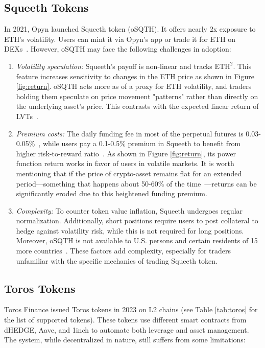 \subsection{Squeeth Tokens}\label{subsec:squeeth}
In 2021, Opyn launched Squeeth token (oSQTH). It offers nearly 2x exposure to ETH's volatility. Users can mint it via Opyn's app or trade it for ETH on DEXs~\cite{Squeeth_Doc}. However, oSQTH may face the following challenges in adoption:
\begin{enumerate}[label={\ref{subsec:squeeth}.\arabic*},leftmargin=*]
	\item \textit{Volatility speculation:} Squeeth's payoff is non-linear and tracks \( \text{ETH}^2 \). This feature increases sensitivity to changes in the ETH price as shown in Figure \ref{fig:return}. oSQTH acts more as of a proxy for ETH volatility, and traders holding them speculate on price movement "patterns" rather than directly on the underlying asset's price. This contrasts with the expected linear return of LVTs~\cite{Squeeth_Medium}.
	
	\item \textit{Premium costs:} The daily funding fee in most of the perpetual futures is 0.03-0.05\%~\cite{Coinglass_Funding}, while users pay a 0.1-0.5\% premium in Squeeth to benefit from higher risk-to-reward ratio~\cite{Squeeth_Funding}. As shown in Figure \ref{fig:return}, its power function return works in favor of users in volatile markets. It is worth mentioning that if the price of crypto-asset remains flat for an extended period—something that happens about 50-60\% of the time~\cite{bulkowski2011encyclopedia,edwards2007technical}—returns can be significantly eroded due to this heightened funding premium.
	
	\item \textit{Complexity:} To counter token value inflation, Squeeth undergoes regular normalization. Additionally, short positions require users to post collateral to hedge against volatility risk, while this is not required for long positions. Moreover, oSQTH is not available to U.S. persons and certain residents of 15 more countries~\cite{Squeeth_Restricted}. These factors add complexity, especially for traders unfamiliar with the specific mechanics of trading Squeeth token.
\end{enumerate}


\subsection{Toros Tokens}\label{subsec:toros}
Toros Finance issued Toros tokens in 2023 on L2 chains (see Table \ref{tab:toros} for the list of supported tokens). These tokens use different smart contracts from dHEDGE, Aave, and 1inch to automate both leverage and asset management. The system, while decentralized in nature, still suffers from some limitations:

